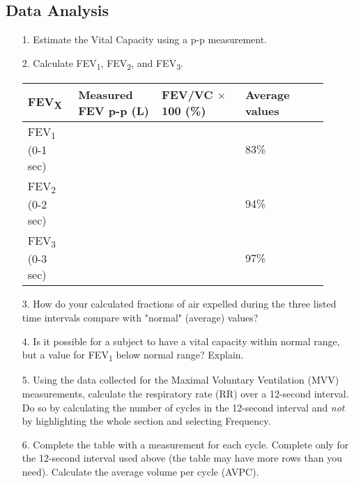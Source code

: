 \documentclass{article}
\begin{document}
\subsection*{Data Analysis}
\begin{itemize}
	\item[1.] Estimate the Vital Capacity using a p-p measurement.\vspace{1cm}
	\item[2.] Calculate FEV\textsubscript{1}, FEV\textsubscript{2}, and FEV\textsubscript{3}.
	
	\begin{table}[h]
	\centering
	\begin{tabular}[h!]{p{0.15\linewidth}|p{0.25\linewidth}p{0.25\linewidth}p{0.25\linewidth}}
	\toprule
	FEV\textsubscript{X} & Measured FEV p-p (L) & FEV/VC $\times$ 100 (\%) & Average values\\
	\midrule
	FEV\textsubscript{1} (0-1 sec) & & & 83\%\\\midrule
	FEV\textsubscript{2} (0-2 sec) & & & 94\%\\\midrule
	FEV\textsubscript{3} (0-3 sec) & & & 97\%\\
	\bottomrule
	\end{tabular}
	\end{table}\vspace{0cm}
	
	\item[3.] How do your calculated fractions of air expelled during the three listed time intervals compare with "normal" (average) values?\vspace{2cm}
	\item[4.] Is it possible for a subject to have a vital capacity within normal range, but a value for FEV\textsubscript{1} below normal range? Explain.\vspace{3cm}
	\item[5.] Using the data collected for the Maximal Voluntary Ventilation (MVV) measurements, calculate the respiratory rate (RR) over a 12-second interval. Do so by calculating the number of cycles in the 12-second interval and \textit{not} by highlighting the whole section and selecting Frequency.\vspace{2cm}
	\item[6.] Complete the table with a measurement for each cycle. Complete only for the 12-second interval used above (the table may have more rows than you need). Calculate the average volume per cycle (AVPC).
	

\end{itemize}
\end{document}
